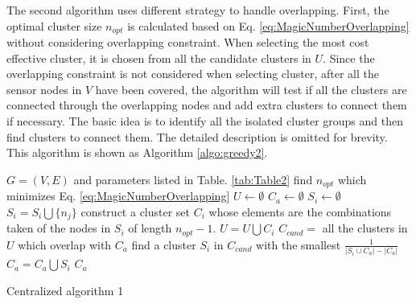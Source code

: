 The second algorithm uses different strategy to handle overlapping.  First, the optimal cluster size \(n_{opt}\) is calculated based on Eq. \ref{eq:MagicNumberOverlapping} without considering overlapping constraint. When selecting the most cost effective cluster, it is chosen from all the candidate clusters in \(U\). Since the overlapping constraint is not considered when selecting cluster, after all the sensor nodes in \(V\) have been covered, the algorithm will test if all the clusters are connected through the overlapping nodes and add extra clusters to connect them if necessary. The basic idea is to identify all the isolated cluster groups and then find clusters to connect them. The detailed description is omitted for brevity. This algorithm is shown as Algorithm \ref{algo:greedy2}. 

\begin{comment}
To achieve this, all the isolated cluster groups (ICGs) from the obtained clusters are identified . Clusters within an ICG are connected through overlapping nodes but do not overlap with other ICGs. Each ICG is then represented as a vertex in a graph \(G_{ICG}\). There is an edge between two vertices in \(G_{ICG}\) if there exist two nodes, each within a ICG corresponding to one of the two vertices, are within the communication range of each other. Then the minimum spanning tree (MST) is found that can connect all the vertices in \(G_{ICG}\). For each edge in the MST, an extra cluster is established in which the two sensor nodes associated with the edge are included. If \(p \geq 2\), then additional nodes should also be added to satisfy the constraint 3 of the optimal clustering problem. This algorithm is shown as Algorithm \ref{algo:greedy2}.
\end{comment}

\begin{algorithm}
\begin{algorithmic}[1]
\REQUIRE \(G=(V, E)\) and parameters listed in Table. \ref{tab:Table2}
\STATE find \(n_{opt}\) which minimizes Eq. \ref{eq:MagicNumberOverlapping}
	\STATE \(U\gets \emptyset\) \(C_a\gets \emptyset\)
		\STATE \(S_i\gets \emptyset\)
			\STATE \(S_i = S_i \bigcup \{n_j\}\)
		\ENDFOR
		\STATE construct a cluster set \(C_i\) whose elements are the combinations taken of the nodes in \(S_i\) of length \(n_{opt} - 1\).
		\STATE \(U=U\bigcup C_i\)
	\ENDFOR
	 	\REPEAT
	 \STATE \(C_{cand} =\) all the clusters in \(U\) which overlap with \(C_a\)
		\STATE find a cluster \(S_i\) in \(C_{cand}\) with the smallest \(\frac{1}{\left|S_i\cup C_a\right| - \left|C_a\right|}\)
		\STATE \(C_a=C_a\bigcup S_i\)	
	\ENSURE \(C_a\)
\end{algorithmic}
\caption{Centralized algorithm 1}
\label{algo:greedy1}
\end{algorithm}

